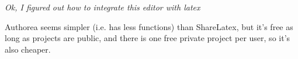 \textit{Ok, I figured out how to integrate this editor with latex} 

Authorea seems simpler (i.e. has less functions) than ShareLatex, but it's free as long as projects are public, and there is one free private project per user, so it's also cheaper.
    
  